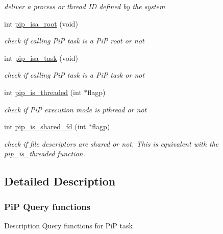 \begin{DoxyCompactItemize}
\begin{DoxyCompactList}\small\item\em deliver a process or thread I\-D defined by the system \end{DoxyCompactList}\item 
int \hyperlink{group__PiP-4-query_ga6f1045bdbf682cb2ac504f09b57b73e9}{pip\-\_\-isa\-\_\-root} (void)
\begin{DoxyCompactList}\small\item\em check if calling Pi\-P task is a Pi\-P root or not \end{DoxyCompactList}\item 
int \hyperlink{group__PiP-4-query_gaf0283e47ad2d415206d6a3fa61e8a0a9}{pip\-\_\-isa\-\_\-task} (void)
\begin{DoxyCompactList}\small\item\em check if calling Pi\-P task is a Pi\-P task or not \end{DoxyCompactList}\item 
int \hyperlink{group__PiP-4-query_ga0455093d5040ae45585cc88a5f3f002b}{pip\-\_\-is\-\_\-threaded} (int $\ast$flagp)
\begin{DoxyCompactList}\small\item\em check if Pi\-P execution mode is pthread or not \end{DoxyCompactList}\item 
int \hyperlink{group__PiP-4-query_ga180ece8f3f537d84db8e70921f3ae099}{pip\-\_\-is\-\_\-shared\-\_\-fd} (int $\ast$flagp)
\begin{DoxyCompactList}\small\item\em check if file descriptors are shared or not. This is equivalent with the {\ttfamily pip\-\_\-is\-\_\-threaded} function. \end{DoxyCompactList}\end{DoxyCompactItemize}


\subsection{Detailed Description}
\hypertarget{pip-query}{}\subsubsection{Pi\-P Query functions}\label{pip-query}
\begin{DoxyParagraph}{Description}
Query functions for Pi\-P task 
\end{DoxyParagraph}


